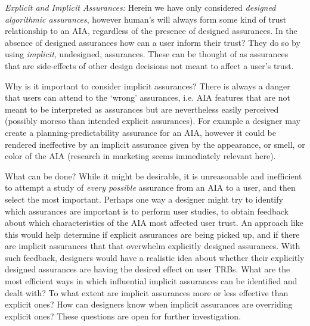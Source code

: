 \emph{Explicit and Implicit Assurances:}
Herein we have only considered \emph{designed algorithmic assurances}, however human's will always form some kind of trust relationship to an AIA, regardless of the presence of designed assurances. In the absence of designed assurances how can a user inform their trust? They do so by using \emph{implicit}, undesigned, assurances. These can be thought of as assurances that are side-effects of other design decisions not meant to affect a user's trust.

Why is it important to consider implicit assurances? There is always a danger that users can attend to the `wrong' assurances, i.e. AIA features that are not meant to be interpreted as assurances but are nevertheless easily perceived (possibly moreso than intended explicit assurances). For example a designer may create a planning-predictability assurance for an AIA, however it could be rendered ineffective by an implicit assurance given by the appearance, or smell, or color of the AIA (research in marketing seems immediately relevant here).

What can be done? While it might be desirable, it is unreasonable and inefficient to attempt a study of \emph{every possible} assurance from an AIA to a user, and then select the most important. Perhaps one way a designer might try to identify which assurances are important is to perform user studies, to obtain feedback about which characteristics of the AIA most affected user trust. An approach like this would help determine if explicit assurances are being picked up, and if there are implicit assurances that that overwhelm explicitly designed assurances. With such feedback, designers would have a realistic idea about whether their explicitly designed assurances are having the desired effect on user TRBs. What are the most efficient ways in which influential implicit assurances can be identified and dealt with? To what extent are implicit assurances more or less effective than explicit ones? How can designers know when implicit assurances are overriding explicit ones? These questions are open for further investigation.
